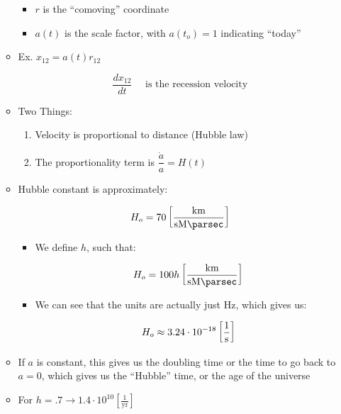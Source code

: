 \begin{itemize}
\begin{itemize}
\begin{itemize}
          \item $r$ is the ``comoving'' coordinate

          \item $a(t)$ is the scale factor, with $a(t_o)=1$ indicating ``today''

        \end{itemize}

      \item Ex. $x_{12}=a(t)r_{12}$

        $$\frac{dx_{12}}{dt}\quad\text{ is the recession velocity}$$

      \item Two Things:

        \begin{enumerate}

          \item Velocity is proportional to distance (Hubble law)

          \item The proportionality term is $\dfrac{\dot{a}}{a}=H(t)$

        \end{enumerate}

      \item Hubble constant is approximately:

        $$H_o=70\left[ \si{\kilo\meter\over\second\mega\parsec} \right]$$

        \begin{itemize}

          \item We define $h$, such that:

            $$H_o=100h\left[ \si{\kilo\meter\over\second\mega\parsec} \right]$$

          \item We can see that the units are actually just $\si{\hertz}$, which gives us:

          $$H_o\approx 3.24\cdot10^{-18}\left[\si{1\over\second}\right]$$

        \end{itemize}

      \item If $a$ is constant, this gives us the doubling time or the time to go back to $a=0$, which gives us the ``Hubble'' time, or the age of the universe

      \item For $h=.7\to 1.4\cdot10^{10}\left[ \frac{1}{\text{yr}} \right]$


\end{itemize}
\end{itemize}
